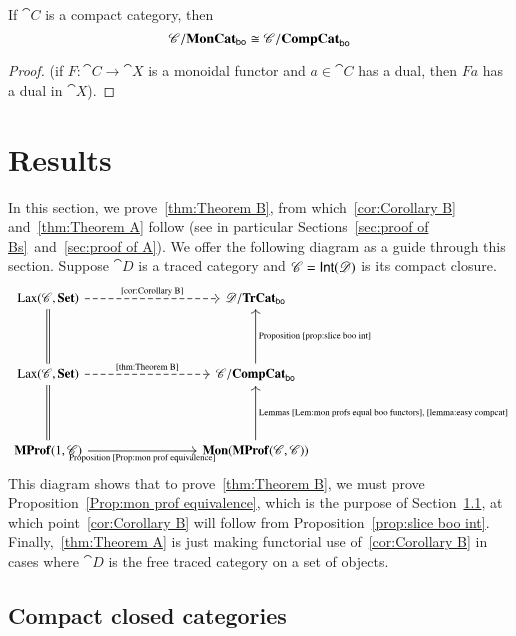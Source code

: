 \documentclass[12pt,oneside,article,draft]{memoir}
\begin{document}
\begin{enumerate}
\begin{lemma}\label{lemma:easy compcat}
	If $\cat{C}$ is a compact category, then
	\[
		\mathscr{C}/\mathbf{MonCat}_{\mathsf{bo}}\cong\mathscr{C}/\mathbf{CompCat}_{\mathsf{bo}}
	\]
\end{lemma}
\begin{proof}
	(if $F\colon\cat{C}\to\cat{X}$ is a monoidal functor and $a\in\cat{C}$ has a dual, then $Fa$ has a dual in $\cat{X}$).
\end{proof}


\chapter{Results}\label{sec:generalization}

In this section, we prove~\ref{thm:Theorem B}, from which~\ref{cor:Corollary B} and~\ref{thm:Theorem A} follow (see in particular Sections~\ref{sec:proof of Bs}~and~\ref{sec:proof of A}).
We offer the following diagram as a guide through this section.
Suppose $\cat{D}$ is a traced category and $\mathscr{C}=\mathsf{Int}(\mathscr{D})$ is its compact closure. 
\[
\begin{tikzcd}[column sep=3cm,row sep=1.5cm]
	\Lax(\cat{C},\Set)\ar[r,dashed,"\tn{\ref{cor:Corollary B}}"]\ar[d,equal] & \cat{D}/\TrCat_{\bo} \\
	\Lax(\cat{C},\Set)\ar[r,dashed,"\tn{\ref{thm:Theorem B}}"]\ar[d,equal] & \cat{C}/\CompCat_{\bo}\ar[u,"\tn{Proposition~\ref{prop:slice boo int}}"'] \\
	\MProf(1,\cat{C})\ar[r,"\tn{Proposition~\ref{Prop:mon prof equivalence}}"'] & \Mon(\MProf(\cat{C},\cat{C}))\ar[u,"\tn{Lemmas~\ref{Lem:mon profs equal boo functors},\ \ref{lemma:easy compcat}}"']
\end{tikzcd}
\]
This diagram shows that to prove~\ref{thm:Theorem B}, we must prove Proposition~\ref{Prop:mon prof equivalence}, which is the purpose of Section~\ref{sec:ccc's}, at which point~\ref{cor:Corollary B} will follow from Proposition~\ref{prop:slice boo int}.
Finally,~\ref{thm:Theorem A} is just making functorial use of~\ref{cor:Corollary B} in cases where $\cat{D}$ is the free traced category on a set of objects.

\section{Compact closed categories}\label{sec:ccc's}



\end{enumerate}
\end{document}
